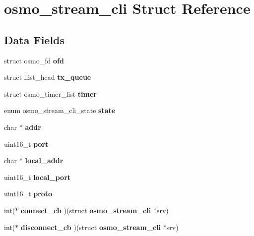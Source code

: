 \section{osmo\+\_\+stream\+\_\+cli Struct Reference}
\label{structosmo__stream__cli}
\subsection*{Data Fields}
\begin{DoxyCompactItemize}
\item 
struct osmo\+\_\+fd {\bfseries ofd}\label{structosmo__stream__cli_a4accf4d91be7cd280b04d3a016769977}

\item 
struct llist\+\_\+head {\bfseries tx\+\_\+queue}\label{structosmo__stream__cli_a3a41ee68801b72a98480b846361af2fb}

\item 
struct osmo\+\_\+timer\+\_\+list {\bfseries timer}\label{structosmo__stream__cli_a7624330c3f4951c363d6df3765ff18fc}

\item 
enum osmo\+\_\+stream\+\_\+cli\+\_\+state {\bfseries state}\label{structosmo__stream__cli_a7f4473e13d4f045eb51a856195d8c237}

\item 
char $\ast$ {\bfseries addr}\label{structosmo__stream__cli_a6adcfeda508ec593e675439d629a7649}

\item 
uint16\+\_\+t {\bfseries port}\label{structosmo__stream__cli_a45b9970e789ab5694b3955e64881fe88}

\item 
char $\ast$ {\bfseries local\+\_\+addr}\label{structosmo__stream__cli_ac443a372b4af9aa07c36e97cade81ca6}

\item 
uint16\+\_\+t {\bfseries local\+\_\+port}\label{structosmo__stream__cli_ac7b73e33d3984e5f1b7630c245c803c4}

\item 
uint16\+\_\+t {\bfseries proto}\label{structosmo__stream__cli_a5b9f6feee81f5710f8bd071f1fca0ad5}

\item 
int($\ast$ {\bfseries connect\+\_\+cb} )(struct {\bf osmo\+\_\+stream\+\_\+cli} $\ast$srv)\label{structosmo__stream__cli_ad8a0379dc5c287ec8724f1f69a349b1d}

\item 
int($\ast$ {\bfseries disconnect\+\_\+cb} )(struct {\bf osmo\+\_\+stream\+\_\+cli} $\ast$srv)\label{structosmo__stream__cli_a8077cee10ab7ce56a9a7e319c14b9f99}


\end{DoxyCompactItemize}
